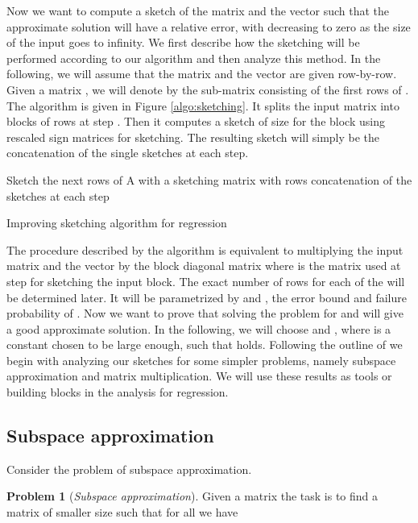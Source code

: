 \documentclass[a4paper,11pt,oneside,english,onecolumn]{article}
\theoremstyle{definition}
\newtheorem{problem}{Problem}
\begin{document}
Now we want to compute a sketch of the matrix  and the vector  such that the approximate solution will have a  relative error, with  decreasing to zero as the size of the input goes to infinity. We first describe how the sketching will be performed according to our algorithm and then analyze this method. In the following, we will assume that the matrix  and the vector  are given row-by-row. Given a matrix , we will denote by  the sub-matrix consisting of the first  rows of . The algorithm is given in Figure \ref{algo:sketching}. It splits the input matrix into blocks of  rows at step . Then it computes a sketch of size  for the block  using rescaled sign matrices for sketching. The resulting sketch will simply be the concatenation of the single sketches at each step.

\begin{algorithm}
\DontPrintSemicolon {}
\;
 {
Sketch the next  rows of A with a sketching matrix  with  rows\;
  \;
}
\Return concatenation of the sketches at each step\;
\caption{Improving sketching algorithm for regression}
\label{algo:sketching}
\end{algorithm}

The procedure described by the algorithm is equivalent to multiplying the input matrix  and the vector  by the block diagonal matrix  where  is the matrix used at step  for sketching the input block. The exact number of rows  for each of the  will be determined later. It will be parametrized by  and , the error bound and failure probability of . Now we want to prove that solving the problem for  and  will give a good approximate solution.
In the following, we will choose  and , where  is a constant chosen to be large enough, such that  holds. Following the outline of \cite{LinAlgStream} we begin with analyzing our sketches for some simpler problems, namely subspace approximation and matrix multiplication. We will use these results as tools or building blocks in the analysis for regression.

\subsection{Subspace approximation}
Consider the problem of subspace approximation.
\begin{problem}[\emph{Subspace approximation}]
Given a matrix  the task is to find a matrix  of smaller size such that for all  we have 
\end{problem}
\end{document}
